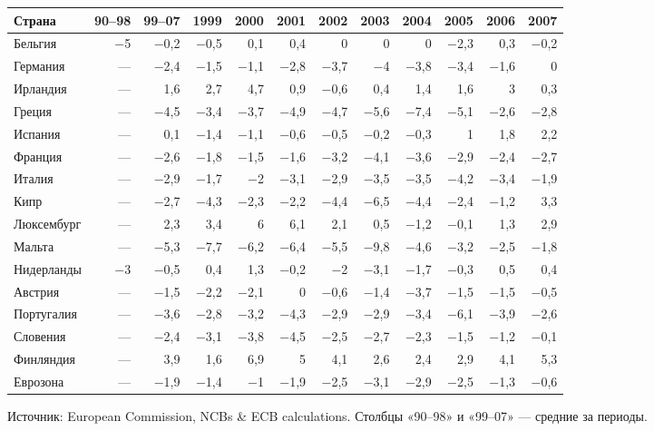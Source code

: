 \documentclass[11pt,a4paper]{article}
\begin{document}
\begin{center}
\footnotesize
\setlength{\tabcolsep}{3.2pt}
\begin{tabular}{lrrrrrrrrrrr}
\toprule
\textbf{Страна} & \textbf{90--98} & \textbf{99--07} & \textbf{1999} & \textbf{2000} & \textbf{2001} & \textbf{2002} & \textbf{2003} & \textbf{2004} & \textbf{2005} & \textbf{2006} & \textbf{2007}\\
\midrule
Бельгия & −5 & −0,2 & −0,5 & 0,1 & 0,4 & 0 & 0 & 0 & −2,3 & 0,3 & −0,2\\
Германия & --- & −2,4 & −1,5 & −1,1 & −2,8 & −3,7 & −4 & −3,8 & −3,4 & −1,6 & 0\\
Ирландия & --- & 1,6 & 2,7 & 4,7 & 0,9 & −0,6 & 0,4 & 1,4 & 1,6 & 3 & 0,3\\
Греция & --- & −4,5 & −3,4 & −3,7 & −4,9 & −4,7 & −5,6 & −7,4 & −5,1 & −2,6 & −2,8\\
Испания & --- & 0,1 & −1,4 & −1,1 & −0,6 & −0,5 & −0,2 & −0,3 & 1 & 1,8 & 2,2\\
Франция & --- & −2,6 & −1,8 & −1,5 & −1,6 & −3,2 & −4,1 & −3,6 & −2,9 & −2,4 & −2,7\\
Италия & --- & −2,9 & −1,7 & −2 & −3,1 & −2,9 & −3,5 & −3,5 & −4,2 & −3,4 & −1,9\\
Кипр & --- & −2,7 & −4,3 & −2,3 & −2,2 & −4,4 & −6,5 & −4,4 & −2,4 & −1,2 & 3,3\\
Люксембург & --- & 2,3 & 3,4 & 6 & 6,1 & 2,1 & 0,5 & −1,2 & −0,1 & 1,3 & 2,9\\
Мальта & --- & −5,3 & −7,7 & −6,2 & −6,4 & −5,5 & −9,8 & −4,6 & −3,2 & −2,5 & −1,8\\
Нидерланды & −3 & −0,5 & 0,4 & 1,3 & −0,2 & −2 & −3,1 & −1,7 & −0,3 & 0,5 & 0,4\\
Австрия & --- & −1,5 & −2,2 & −2,1 & 0 & −0,6 & −1,4 & −3,7 & −1,5 & −1,5 & −0,5\\
Португалия & --- & −3,6 & −2,8 & −3,2 & −4,3 & −2,9 & −2,9 & −3,4 & −6,1 & −3,9 & −2,6\\
Словения & --- & −2,4 & −3,1 & −3,8 & −4,5 & −2,5 & −2,7 & −2,3 & −1,5 & −1,2 & −0,1\\
Финляндия & --- & 3,9 & 1,6 & 6,9 & 5 & 4,1 & 2,6 & 2,4 & 2,9 & 4,1 & 5,3\\
\midrule
Еврозона & --- & −1,9 & −1,4 & −1 & −1,9 & −2,5 & −3,1 & −2,9 & −2,5 & −1,3 & −0,6\\
\bottomrule
\end{tabular}

{\footnotesize Источник: European Commission, NCBs \& ECB calculations. Столбцы «90--98» и «99--07» --- средние за периоды.}
\end{center}
\end{document}
